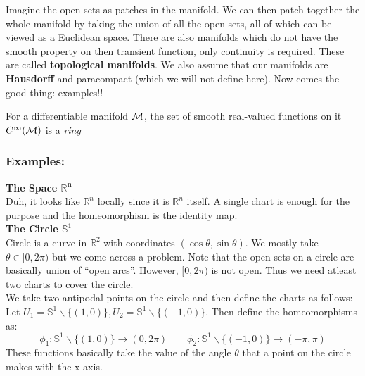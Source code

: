 Imagine the open sets as patches in the manifold. We can then patch together the whole manifold by taking the union of all the open sets, all of which can be viewed as a Euclidean space. There are also manifolds which do not have the smooth property on then transient function, only continuity is required. These are called \textbf{topological manifolds}. We also assume that our manifolds are \textbf{Hausdorff} and paracompact (which we will not define here). Now comes the good thing: examples!!
\begin{ffact}
For a differentiable manifold $\mathcal M$, the set of smooth real-valued functions on it $C^\infty(\mathcal M)$ is a \textit{ring}
\end{ffact}
\subsubsection{Examples:}
\textbf{The Space $\mathbf{\mathbb{R}^n}$}\\[0.3cm]
Duh, it looks like $\mathbb{R}^n$ locally since it is $\mathbb{R}^n$ itself. A single chart is enough for the purpose and the homeomorphism is the identity map. \\[0.3cm]
\textbf{The Circle $\mathbb{S}^1$}\\[0.3cm]
Circle is a curve in $\mathbb{R}^2$ with coordinates $(\cos\theta, \sin\theta)$. We mostly take $\theta \in [0,2\pi)$ but we come across a problem. Note that the open sets on a circle are basically union of ``open arcs''. However, $[0,2\pi)$ is not open. Thus we need atleast two charts to cover the circle.\\[0.3cm]
We take two antipodal points on the circle and then define the charts as follows: \\[0.3cm]
Let $U_1 = \mathbb{S}^1\backslash \{(1,0)\},U_2 = \mathbb{S}^1\backslash \{(-1,0)\}$. Then define the homeomorphisms as:
$$\phi_1: \mathbb{S}^1\backslash \{(1,0)\}\rightarrow (0,2\pi) \quad \quad \phi_2: \mathbb{S}^1\backslash \{(-1,0)\}\rightarrow (-\pi,\pi)$$
These functions basically take the value of the angle $\theta$ that a point on the circle makes with the x-axis.  
